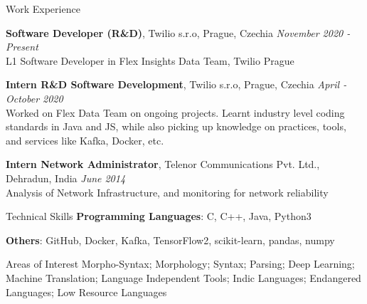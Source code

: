 \documentclass{resume}
\begin{document}
\begin{rSection}{Work Experience}

    {\textbf{Software Developer (R\&D)}, Twilio s.r.o, Prague, Czechia}
        \hfill {\em November 2020 - Present}\\
            L1 Software Developer in Flex Insights Data Team, Twilio Prague
            
    {\textbf{Intern R\&D Software Development}, Twilio s.r.o, Prague, Czechia}
        \hfill {\em April - October 2020}\\
            Worked on Flex Data Team on ongoing projects. Learnt industry level coding 
            standards in Java and JS, while also picking up knowledge on practices, tools, and services like Kafka, Docker, etc.

    {\textbf{Intern Network Administrator}, Telenor Communications Pvt. Ltd., Dehradun, India}
        \hfill {\em June 2014}\\
            Analysis of Network Infrastructure, and monitoring for 
            network reliability

\end{rSection}



\begin{rSection}{Technical Skills}
    {\textbf{Programming Languages}: C, C++, Java, Python3}
    
    {\textbf{Others}: GitHub, Docker, Kafka, TensorFlow2, scikit-learn, pandas, numpy}
    
    \begin{rSubsection}{Areas of Interest}{}{}{}
        Morpho-Syntax; Morphology; Syntax; Parsing; Deep Learning; Machine Translation; 
        Language Independent Tools; Indic Languages; Endangered Languages; Low Resource 
        Languages
    \end{rSubsection}
\end{rSection}

\end{document}
